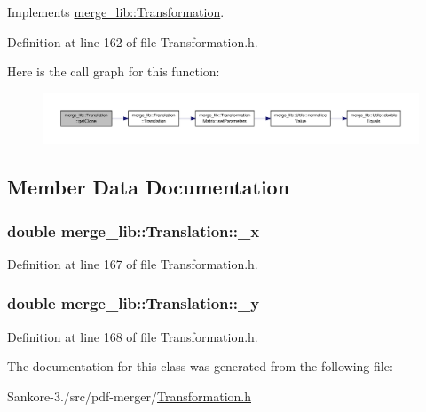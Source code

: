 Implements \hyperlink{classmerge__lib_1_1_transformation_a7ebaa86d0aa408c14090ebf4289d99eb}{merge\-\_\-lib\-::\-Transformation}.



Definition at line 162 of file Transformation.\-h.



Here is the call graph for this function\-:
\nopagebreak
\begin{figure}[H]
\begin{center}
\leavevmode
\includegraphics[width=350pt]{d8/d1d/classmerge__lib_1_1_translation_a2639b37271bc3b34f3f3179049c620c6_cgraph}
\end{center}
\end{figure}




\subsection{Member Data Documentation}
\hypertarget{classmerge__lib_1_1_translation_aa4aa3614bee4247740ff56beda5f4750}{
\subsubsection[{\-\_\-x}]{\setlength{\rightskip}{0pt plus 5cm}double merge\-\_\-lib\-::\-Translation\-::\-\_\-x\hspace{0.3cm}{\ttfamily [protected]}}}\label{d8/d1d/classmerge__lib_1_1_translation_aa4aa3614bee4247740ff56beda5f4750}


Definition at line 167 of file Transformation.\-h.

\hypertarget{classmerge__lib_1_1_translation_afe664836990dc6fe80492c9efdb05caf}{
\subsubsection[{\-\_\-y}]{\setlength{\rightskip}{0pt plus 5cm}double merge\-\_\-lib\-::\-Translation\-::\-\_\-y\hspace{0.3cm}{\ttfamily [protected]}}}\label{d8/d1d/classmerge__lib_1_1_translation_afe664836990dc6fe80492c9efdb05caf}


Definition at line 168 of file Transformation.\-h.



The documentation for this class was generated from the following file\-:\begin{DoxyCompactItemize}
\item 
Sankore-\/3./src/pdf-\/merger/\hyperlink{_transformation_8h}{Transformation.\-h}\end{DoxyCompactItemize}
